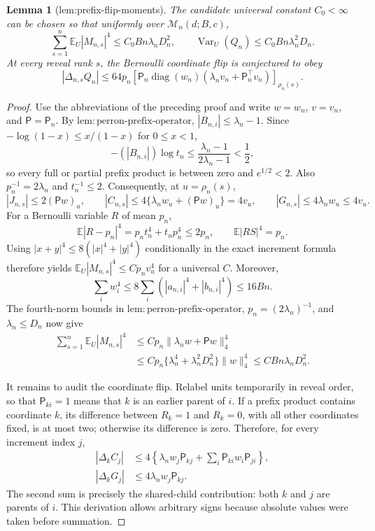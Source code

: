 \documentclass{article}
\newtheorem{lemma}{Lemma}
\begin{document}
\begin{lemma}[lem:prefix-flip-moments]\label{lem:prefix-flip-moments}
The candidate universal constant \(C_0<\infty\) can be chosen so that uniformly over \(\mathcal M_n(d;B,c)\), \[\sum_{s=1}^n\mathbb E_U|M_{n,s}|^4\le C_0Bn\lambda_nD_n^2,\qquad \operatorname{Var}_U(Q_n)\le C_0Bn\lambda_n^2D_n.\] At every reveal rank \(s\), the Bernoulli coordinate flip is conjectured to obey \[|\Delta_{n,s}Q_n|\le64p_n[\mathsf P_n\operatorname{diag}(w_n)(\lambda_nv_n+\mathsf P_n^{\top}v_n)]_{\rho_n(s)}.\]
\end{lemma}
\begin{proof}
Use the abbreviations of the preceding proof and write \(w=w_n\), \(v=v_n\), and \(\mathsf P=\mathsf P_n\).  By \(\mathrm{lem:perron\text{-}prefix\text{-}operator}\), \(|B_{n,i}|\le\lambda_n-1\).  Since \(-\log(1-x)\le x/(1-x)\) for \(0\le x<1\),
\[
 -(|B_{n,i}|)\log t_n
 \le\frac{\lambda_n-1}{2\lambda_n-1}<\frac12,
\]
so every full or partial prefix product is between zero and \(e^{1/2}<2\).  Also \(p_n^{-1}=2\lambda_n\) and \(t_n^{-1}\le2\).  Consequently, at \(u=\rho_n(s)\),
\[
 |J_{n,s}|\le2(\mathsf Pw)_u,\qquad
 |C_{n,s}|\le4\{\lambda_nw_u+(\mathsf Pw)_u\}=4v_u,\qquad
 |G_{n,s}|\le4\lambda_nw_u\le4v_u.
\]
For a Bernoulli variable \(R\) of mean \(p_n\),
\[
 \mathbb E|R-p_n|^4=p_nt_n^4+t_np_n^4\le2p_n,\qquad
 \mathbb E|RS|^4=p_n.
\]
Using \(|x+y|^4\le8(|x|^4+|y|^4)\) conditionally in the exact increment formula therefore yields \(\mathbb E_U|M_{n,s}|^4\le C p_nv_u^4\) for a universal \(C\).  Moreover,
\[
 \sum_iw_i^4\le8\sum_i(|a_{n,i}|^4+|b_{n,i}|^4)\le16Bn.
\]
The fourth-norm bounds in \(\mathrm{lem:perron\text{-}prefix\text{-}operator}\), \(p_n=(2\lambda_n)^{-1}\), and \(\lambda_n\le D_n\) now give
\[
 \begin{aligned}
 \sum_{s=1}^n\mathbb E_U|M_{n,s}|^4
 &\le Cp_n\|\lambda_nw+\mathsf Pw\|_4^4\\
 &\le Cp_n\{\lambda_n^4+\lambda_n^2D_n^2\}\|w\|_4^4
 \le C Bn\lambda_nD_n^2.
 \end{aligned}
\]

It remains to audit the coordinate flip.  Relabel units temporarily in reveal order, so that \(\mathsf P_{ki}=1\) means that \(k\) is an earlier parent of \(i\).  If a prefix product contains coordinate \(k\), its difference between \(R_k=1\) and \(R_k=0\), with all other coordinates fixed, is at most two; otherwise its difference is zero.  Therefore, for every increment index \(j\),
\[
 \begin{aligned}
 |\Delta_k C_j|
 &\le4\left\{\lambda_nw_j\mathsf P_{kj}
       +\sum_i\mathsf P_{ki}w_i\mathsf P_{ji}\right\},\\
 |\Delta_k G_j|&\le4\lambda_nw_j\mathsf P_{kj}.
 \end{aligned}
\]
The second sum is precisely the shared-child contribution: both \(k\) and \(j\) are parents of \(i\).  This derivation allows arbitrary signs because absolute values were taken before summation.


\end{proof}
\end{document}
